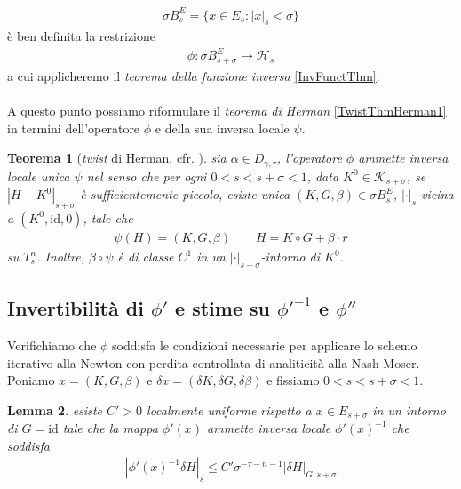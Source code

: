 \documentclass[twoside, 11pt]{amsbook}
\newcommand{\0}{{(0)}}
\newcommand{\3}{{(3)}}
\theoremstyle{colonplain}
\newtheorem{thm}{Teorema}[chapter]
\newtheorem{lemma}[thm]{Lemma}
\theoremstyle{colondefinition}
\theoremstyle{colonremark}
\numberwithin{equation}{chapter}
\begin{document}
\begin{align}
    \sigma B^E_s = \{x \in E_s : |x|_s < \sigma\}
\end{align}
è ben definita la restrizione
\begin{align}
    \phi : \sigma B^E_{s + \sigma} \longrightarrow \mathcal{H}_s
\end{align}
a cui applicheremo il \textit{teorema della funzione inversa} \ref{InvFunctThm}. \\ \\
A questo punto possiamo riformulare il \textit{teorema di Herman} \ref{TwistThmHerman1} in termini dell'operatore $\phi$ e della sua inversa locale $\psi$.
\begin{thm}[\textit{twist} di Herman, cfr. \cite{Fejoz17}]\label{TwistThmHerman2} sia $\alpha \in D_{\gamma, \tau}$, l'operatore $\phi$ ammette inversa locale unica $\psi$ nel senso che per ogni $0 < s < s + \sigma < 1$, data $K^0 \in \mathcal{K}_{s + \sigma}$, se $|H - K^0|_{s + \sigma}$ è sufficientemente piccolo, esiste unica $(K, G, \beta) \in \sigma B^E_s$, $|\cdot|_s$-vicina a $(K^0, \mathrm{id}, 0)$, tale che
\begin{align}
    \psi(H) = (K, G, \beta) \qquad H = K \circ G + \beta \cdot r
\end{align}
su $T^n_s$. Inoltre, $\beta \circ \psi$ è di classe $C^1$ in un $|\cdot|_{s + \sigma}$-intorno di $K^0$.
\end{thm}
\subsection{Invertibilità di $\phi'$ e stime su $\phi'^{-1}$ e $\phi''$}
Verifichiamo che $\phi$ soddisfa le condizioni necessarie per applicare lo schemo iterativo alla Newton con perdita controllata di analiticità alla Nash-Moser. \\
Poniamo $x = (K, G, \beta)$ e $\delta x = (\delta K, \delta G, \delta \beta)$ e fissiamo $0 < s < s + \sigma < 1$.
\begin{lemma} esiste $C' > 0$ localmente uniforme rispetto a $x \in E_{s + \sigma}$ in un intorno di $G = \mathrm{id}$ tale che la mappa $\phi'(x)$ ammette inversa locale $\phi'(x)^{-1}$ che soddisfa
\begin{align}
    |\phi'(x)^{-1}\delta H|_{s} \leq C'\sigma^{-\tau - n - 1}|\delta H|_{G, s + \sigma}
\end{align}
\end{lemma}
\end{document}
